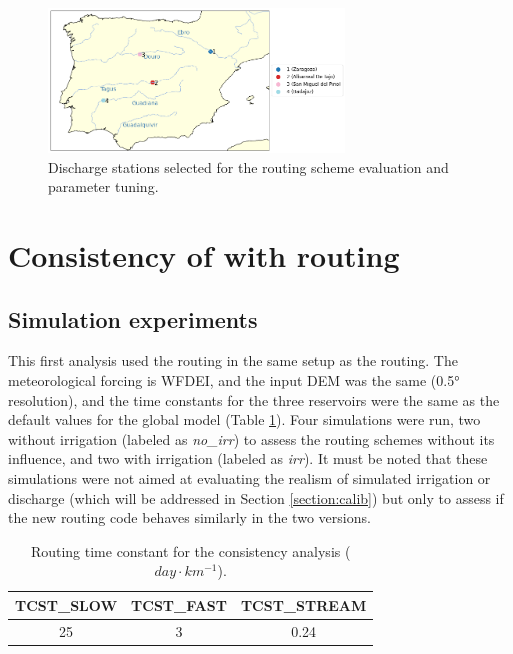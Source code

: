\begin{figure}[htbp]
    \centering
    \includegraphics[width=0.7\textwidth]{images/chap3/river_discharge/halfdeg_4stations_map.png}
    \caption{Discharge stations selected for the routing scheme evaluation and parameter tuning.}
    \label{fig:halfedg_stations_map}
\end{figure}

\section{Consistency of \native with \std routing}
\label{sec:routing_consistency}
\subsection{Simulation experiments}

This first analysis used the \native routing in the same setup as the \std routing. The meteorological forcing is WFDEI, and the input DEM was the same (0.5° resolution), and the time constants for the three reservoirs were the same as the default values for the global model (Table \ref{table:tcst_consistency}).
Four simulations were run, two without irrigation (labeled as \textit{no\_irr}) to assess the routing schemes without its influence, and two with irrigation (labeled as \textit{irr}). It must be noted that these simulations were not aimed at evaluating the realism of simulated irrigation or discharge (which will be addressed in Section \ref{section:calib}) but only to assess if the new routing code behaves similarly in the two versions.

\begin{table}[h]
\centering
\begin{tabular}{|c|c|c|}
\hline
\textbf{TCST\_SLOW} & \textbf{TCST\_FAST} & \textbf{TCST\_STREAM} \\ \hline
25            & 3             & 0.24            \\ \hline
\end{tabular}
\caption{Routing time constant for the consistency analysis ($day \cdot km^{-1}$).}
\label{table:tcst_consistency}
\end{table}

